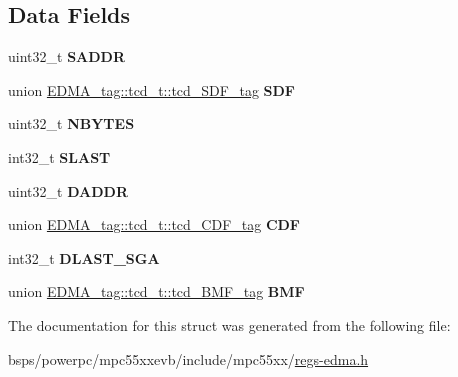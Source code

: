 \subsection*{Data Fields}
\begin{DoxyCompactItemize}
\item 
\mbox{\label{structEDMA__tag_1_1tcd__t_aedbf891e18ae8ca895aa7e7729aad360}} 
uint32\+\_\+t {\bfseries S\+A\+D\+DR}
\item 
\mbox{\label{structEDMA__tag_1_1tcd__t_ae77e62316dbfb14f1251615e8b83656e}} 
union \mbox{\hyperlink{unionEDMA__tag_1_1tcd__t_1_1tcd__SDF__tag}{E\+D\+M\+A\+\_\+tag\+::tcd\+\_\+t\+::tcd\+\_\+\+S\+D\+F\+\_\+tag}} {\bfseries S\+DF}
\item 
\mbox{\label{structEDMA__tag_1_1tcd__t_a3887621ff88f3ba72764999bf9d779be}} 
uint32\+\_\+t {\bfseries N\+B\+Y\+T\+ES}
\item 
\mbox{\label{structEDMA__tag_1_1tcd__t_a664ed89f1b78f85d68137bb5de9bc3d4}} 
int32\+\_\+t {\bfseries S\+L\+A\+ST}
\item 
\mbox{\label{structEDMA__tag_1_1tcd__t_a5c9c4bb0bab1958d742a64f7ecf205b0}} 
uint32\+\_\+t {\bfseries D\+A\+D\+DR}
\item 
\mbox{\label{structEDMA__tag_1_1tcd__t_acf363d22ee2e6c53111c5d283fd0ec33}} 
union \mbox{\hyperlink{unionEDMA__tag_1_1tcd__t_1_1tcd__CDF__tag}{E\+D\+M\+A\+\_\+tag\+::tcd\+\_\+t\+::tcd\+\_\+\+C\+D\+F\+\_\+tag}} {\bfseries C\+DF}
\item 
\mbox{\label{structEDMA__tag_1_1tcd__t_afb0124829211b1431416fb7a18a6596b}} 
int32\+\_\+t {\bfseries D\+L\+A\+S\+T\+\_\+\+S\+GA}
\item 
\mbox{\label{structEDMA__tag_1_1tcd__t_a6e8e227e78178811664817bd8baa8291}} 
union \mbox{\hyperlink{unionEDMA__tag_1_1tcd__t_1_1tcd__BMF__tag}{E\+D\+M\+A\+\_\+tag\+::tcd\+\_\+t\+::tcd\+\_\+\+B\+M\+F\+\_\+tag}} {\bfseries B\+MF}
\end{DoxyCompactItemize}


The documentation for this struct was generated from the following file\+:\begin{DoxyCompactItemize}
\item 
bsps/powerpc/mpc55xxevb/include/mpc55xx/\mbox{\hyperlink{regs-edma_8h}{regs-\/edma.\+h}}\end{DoxyCompactItemize}
